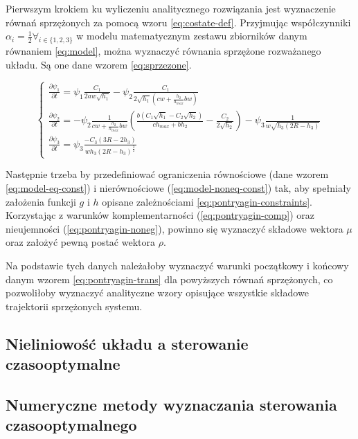 Pierwszym krokiem ku wyliczeniu analitycznego rozwiązania jest wyznaczenie równań sprzężonych za pomocą wzoru \ref{eq:costate-def}. Przyjmując współczynniki $\alpha_{i} = \frac{1}{2} \forall_{i \in \{1, 2, 3\}}$ w modelu matematycznym zestawu zbiorników danym równaniem \ref{eq:model}, można wyznaczyć równania sprzężone rozważanego układu. Są one dane wzorem \ref{eq:sprzezone}.

\begin{equation}\label{eq:sprzezone}
	\left \{
	\begin{array}{lr}
		\frac{\partial \psi_{1}}{\partial t} =  \psi_{1}\frac{C_{1}}{2aw\sqrt{h_{1}}} - \psi_{2}\frac{C_{1}}{2\sqrt{h_{1}}(cw + \frac{h_{2}}{h_{max}}bw)} \\[20pt]
		\frac{\partial \psi_{2}}{\partial t} = - \psi_{2}\frac{1}{cw + \frac{h_{2}}{h_{max}}bw}(\frac{b(C_{1}\sqrt{h_{1}} - C_{2}\sqrt{h_{2}})}{ch_{max} + bh_{2}} - \frac{C_{2}}{2\sqrt{h_{2}}}) - \psi_{3}\frac{1}{w\sqrt{h_{3}(2R - h_{3})}} \\[20pt]
		\frac{\partial \psi_{3}}{\partial t} = \psi_{3}\frac{-C_{3}(3R - 2h_{3})}{wh_{3}(2R - h_{3})^{\frac{3}{2}}}
	\end{array}
	\right.
\end{equation}

Następnie trzeba by przedefiniować ograniczenia równościowe (dane wzorem \ref{eq:model-eq-const}) i nierównościowe (\ref{eq:model-noneq-const}) tak, aby spełniały założenia funkcji $g$ i $h$ opisane zależnościami \ref{eq:pontryagin-constraints}. Korzystając z warunków komplementarności (\ref{eq:pontryagin-comp}) oraz nieujemności (\ref{eq:pontryagin-noneg}), powinno się wyznaczyć składowe wektora $\mu$ oraz założyć pewną postać wektora $\rho$.

Na podstawie tych danych należałoby wyznaczyć warunki początkowy i końcowy danym wzorem \ref{eq:pontryagin-trans} dla powyższych równań sprzężonych, co pozwoliłoby wyznaczyć analityczne wzory opisujące wszystkie składowe trajektorii sprzężonych systemu.


\subsection{Nieliniowość układu a sterowanie czasooptymalne}
\label{sub:toc-nonlnr}


\subsection{Numeryczne metody wyznaczania sterowania czasooptymalnego}
\label{sub:toc-num}
